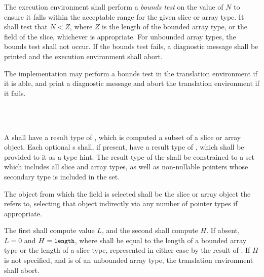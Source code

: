 \specsubsubitem
The execution environment shall perform a \textit{bounds test} on the value of
$N$ to ensure it falls within the acceptable range for the given slice or array
type. It shall test that $N < Z$, where $Z$ is the length of the bounded array
type, or the  field of the slice, whichever is appropriate.  For
unbounded array types, the bounds test shall not occur. If the bounds test
fails, a diagnostic message shall be printed and the execution environment
shall abort.

The implementation may perform a bounds test in the translation environment if
it is able, and print a diagnostic message and abort the translation environment
if it fails.


\begin{grammar}
 \\
	 \terminal{[}    \terminal{]} \\
\end{grammar}

\specsubsubitem
A  shall have a result type of
, which is computed a subset of a slice or array object.
Each optional s shall, if present, have a result type of
, which shall be provided to it as a type hint. The result type
of the  shall be constrained to a set which
includes all slice and array types, as well as non-nullable pointers whose
secondary type is included in the set.


\specsubsubitem
The object from which the field is selected shall be the slice or array object
the  refers to, selecting that object indirectly
via any number of pointer types if appropriate.

\specsubsubitem
The first  shall compute value $L$, and the second shall
compute $H$. If absent, $L = 0$ and $H = \mbox{\textup{\small\texttt{length}}}$, where 
shall be equal to the length of a bounded array type or the length of a slice
type, represented in either case by the result of
. If $H$ is not specified, and
 is of an unbounded array type, the translation
environment shall abort.

